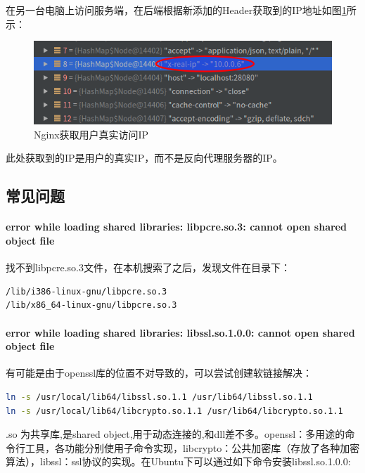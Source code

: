 \documentclass[letter]{book}
\begin{document}
在另一台电脑上访问服务端，在后端根据新添加的Header获取到的IP地址如图\ref{fig:nginxgetrealip}所示：

\begin{figure}[htbp]
	\centering
	\includegraphics[scale=0.6]{nginxgetrealip.png}
	\caption{Nginx获取用户真实访问IP}
	\label{fig:nginxgetrealip}
\end{figure}

此处获取到的IP是用户的真实IP，而不是反向代理服务器的IP。

\subsection{常见问题}

\paragraph{error while loading shared libraries: libpcre.so.3: cannot open shared object file}

找不到libpcre.so.3文件，在本机搜索了之后，发现文件在目录下：

\begin{lstlisting}[language=bash]
/lib/i386-linux-gnu/libpcre.so.3
/lib/x86_64-linux-gnu/libpcre.so.3
\end{lstlisting}

\paragraph{error while loading shared libraries: libssl.so.1.0.0: cannot open shared object file}

有可能是由于openssl库的位置不对导致的，可以尝试创建软链接解决：

\begin{lstlisting}[language=bash]
ln -s /usr/local/lib64/libssl.so.1.1 /usr/lib64/libssl.so.1.1  
ln -s /usr/local/lib64/libcrypto.so.1.1 /usr/lib64/libcrypto.so.1.1  
\end{lstlisting}

.so 为共享库,是shared object,用于动态连接的,和dll差不多。openssl：多用途的命令行工具，各功能分别使用子命令实现，libcrypto：公共加密库（存放了各种加密算法），libssl：ssl协议的实现。在Ubuntu下可以通过如下命令安装libssl.so.1.0.0:
\end{document}
